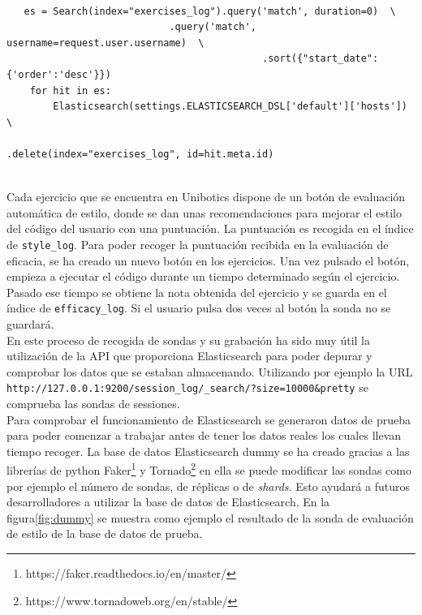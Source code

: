 \\
{\footnotesize
\begin{verbatim}
   es = Search(index="exercises_log").query('match', duration=0)  \
   				            .query('match', username=request.user.username)  \
        					                .sort({"start_date": {'order':'desc'}})
    for hit in es:
        Elasticsearch(settings.ELASTICSEARCH_DSL['default']['hosts'])  \ 
    				                        .delete(index="exercises_log", id=hit.meta.id)
\end{verbatim}
}
\\
Cada ejercicio que se encuentra en Unibotics dispone de un botón de evaluación automática de estilo, donde se dan unas recomendaciones para mejorar el estilo del código del usuario con una puntuación. La puntuación es recogida en el índice de \texttt{style\_log}. Para poder recoger la puntuación recibida en la evaluación de eficacia, se ha creado un nuevo botón en los ejercicios. Una vez pulsado el botón, empieza a ejecutar el código durante un tiempo determinado según el ejercicio. Pasado ese tiempo se obtiene la nota obtenida del ejercicio y se guarda en el índice de \texttt{efficacy\_log}. Si el usuario pulsa dos veces al botón la sonda no se guardará.\\


En este proceso de recogida de sondas y su grabación ha sido muy útil la utilización de la API que proporciona Elasticsearch para poder depurar y comprobar los datos que se estaban almacenando. Utilizando por ejemplo la URL \texttt{http://127.0.0.1:9200/session\_log/\_search/?size=10000&pretty} se comprueba las sondas de sessiones.\\

Para comprobar el funcionamiento de Elasticsearch se generaron datos de prueba para poder comenzar a trabajar antes de tener los datos reales los cuales llevan tiempo recoger. La base de datos Elasticsearch dummy se ha creado gracias a las librerías de python Faker\footnote{https://faker.readthedocs.io/en/master/} y Tornado\footnote{https://www.tornadoweb.org/en/stable/} en ella se puede modificar las sondas como por ejemplo el número de sondas, de réplicas o de \textit{shards}. Esto ayudará a futuros desarrolladores a utilizar la base de datos de Elasticsearch. En la figura\ref{fig:dummy} se muestra como ejemplo el resultado de la sonda de evaluación de estilo de la base de datos de prueba.


